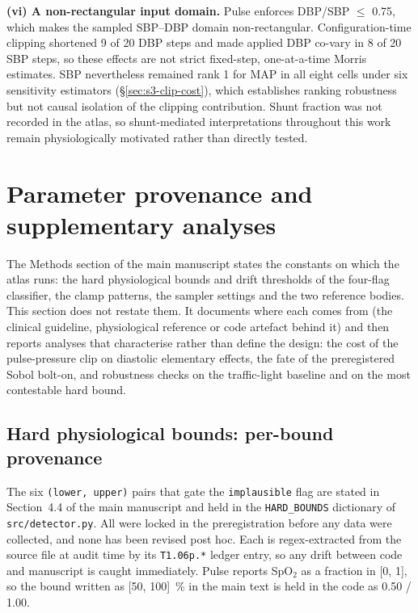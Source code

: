 \documentclass[pdflatex,sn-nature]{sn-jnl}%
\newcommand{\mainref}[2]{#2}
\begin{document}
\textbf{(vi) A non-rectangular input domain.} Pulse enforces DBP/SBP $\leq$ 0.75, which makes the sampled SBP--DBP domain non-rectangular. Configuration-time clipping shortened 9 of 20 DBP steps and made applied DBP co-vary in 8 of 20 SBP steps, so these effects are not strict fixed-step, one-at-a-time Morris estimates. SBP nevertheless remained rank 1 for MAP in all eight cells under six sensitivity estimators (\S\ref{sec:s3-clip-cost}), which establishes ranking robustness but not causal isolation of the clipping contribution. Shunt fraction was not recorded in the atlas, so shunt-mediated interpretations throughout this work remain physiologically motivated rather than directly tested.


\section{Parameter provenance and supplementary analyses}\label{sec:s3}

The Methods section of the main manuscript states the constants on which the atlas runs: the hard physiological bounds and drift thresholds of the four-flag classifier, the clamp patterns, the sampler settings and the two reference bodies. This section does not restate them. It documents where each comes from (the clinical guideline, physiological reference or code artefact behind it) and then reports analyses that characterise rather than define the design: the cost of the pulse-pressure clip on diastolic elementary effects, the fate of the preregistered Sobol bolt-on, and robustness checks on the traffic-light baseline and on the most contestable hard bound.

\subsection{Hard physiological bounds: per-bound provenance}\label{sec:s3-hard-bounds}

The six \texttt{(lower, upper)} pairs that gate the \texttt{implausible} flag are stated in Section~\mainref{sec:methods-detector}{4.4} of the main manuscript and held in the \texttt{HARD\_BOUNDS} dictionary of \texttt{src/detector.py}. All were locked in the preregistration before any data were collected, and none has been revised post hoc. Each is regex-extracted from the source file at audit time by its \texttt{T1.06p.*} ledger entry, so any drift between code and manuscript is caught immediately. Pulse reports SpO$_2$ as a fraction in [0, 1], so the bound written as [50, 100]~\% in the main text is held in the code as 0.50 / 1.00.
\end{document}
